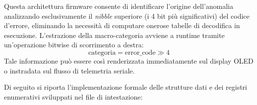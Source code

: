 Questa architettura firmware consente di identificare l'origine dell'anomalia analizzando esclusivamente il \textit{nibble} superiore (i 4 bit più significativi) del codice d'errore, eliminando la necessità di computare onerose tabelle di decodifica in esecuzione. L'estrazione della macro-categoria avviene a runtime tramite un'operazione bitwise di scorrimento a destra:
\begin{equation}
\text{categoria} = \text{error\_code} \gg 4
\end{equation}
Tale informazione può essere così renderizzata immediatamente sul display OLED o instradata sul flusso di telemetria seriale.

Di seguito si riporta l'implementazione formale delle strutture dati e dei registri enumerativi sviluppati nel file di intestazione:

